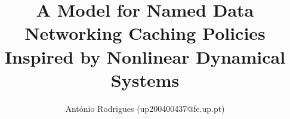 \documentclass[english,journal]{IEEEtran}
\begin{document}
\title{A Model for Named Data Networking Caching Policies Inspired by 
Nonlinear Dynamical Systems}
\author{António Rodrigues (up200400437@fe.up.pt)}

\maketitle










%



%





\end{document}
